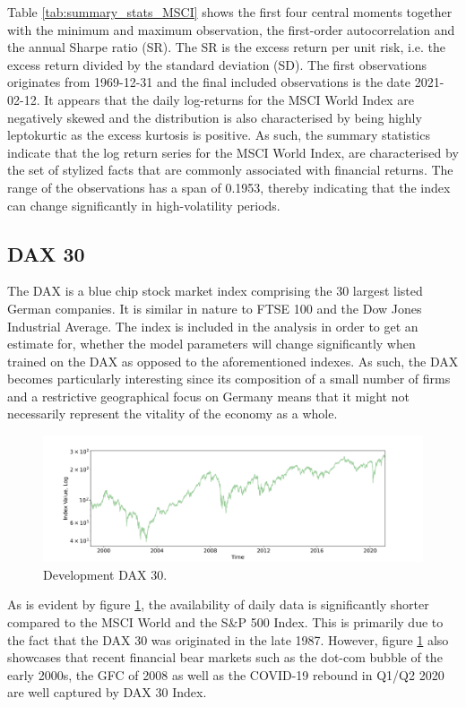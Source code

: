 Table \ref{tab:summary_stats_MSCI} shows the first four central moments together with the minimum and maximum observation, the first-order autocorrelation and the annual Sharpe ratio (SR). The SR is the excess return per unit risk, i.e. the excess return divided by the standard deviation (SD). The first observations originates from 1969-12-31 and the final included observations is the date 2021-02-12. It appears that the daily log-returns for the MSCI World Index are negatively skewed and the distribution is also characterised by being highly leptokurtic as the excess kurtosis is positive. As such, the summary statistics indicate that the log return series for the MSCI World Index, are characterised by the set of stylized facts that are commonly associated with financial returns. The range of the observations has a span of 0.1953, thereby indicating that the index can change significantly in high-volatility periods.

\subsection{DAX 30}
\label{subsection: DAX 30}
The DAX is a blue chip stock market index comprising the 30 largest listed German companies. It is similar in nature to FTSE 100 and the Dow Jones Industrial Average. The index is included in the analysis in order to get an estimate for, whether the model parameters will change significantly when trained on the DAX as opposed to the aforementioned indexes. As such, the DAX becomes particularly interesting since its composition of a small number of firms and a restrictive geographical focus on Germany means that it might not necessarily represent the vitality of the economy as a whole. 

\begin{figure}[H] 
    \centering
    \includegraphics[width=1\textwidth]{analysis/data_description/images/DAX_index.png}
    \caption{Development DAX 30.}
    \label{fig: DAX_index}
\end{figure}

As is evident by figure \ref{fig: DAX_index}, the availability of daily data is significantly shorter compared to the MSCI World and the S\&P 500 Index. This is primarily due to the fact that the DAX 30 was originated in the late 1987. However, figure \ref{fig: DAX_index} also showcases that recent financial bear markets such as the dot-com bubble of the early 2000s, the GFC of 2008 as well as the COVID-19 rebound in Q1/Q2 2020 are well captured by DAX 30 Index. 

